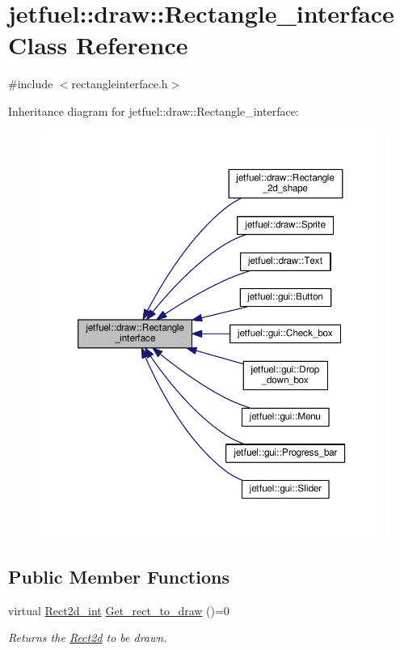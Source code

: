 \hypertarget{classjetfuel_1_1draw_1_1Rectangle__interface}{}\section{jetfuel\+:\+:draw\+:\+:Rectangle\+\_\+interface Class Reference}
\label{classjetfuel_1_1draw_1_1Rectangle__interface}


{\ttfamily \#include $<$rectangleinterface.\+h$>$}



Inheritance diagram for jetfuel\+:\+:draw\+:\+:Rectangle\+\_\+interface\+:
\nopagebreak
\begin{figure}[H]
\begin{center}
\leavevmode
\includegraphics[width=350pt]{classjetfuel_1_1draw_1_1Rectangle__interface__inherit__graph}
\end{center}
\end{figure}
\subsection*{Public Member Functions}
\begin{DoxyCompactItemize}
\item 
virtual \hyperlink{classjetfuel_1_1draw_1_1Rect2d}{Rect2d\+\_\+int} \hyperlink{classjetfuel_1_1draw_1_1Rectangle__interface_a03fd3b6842ab7b3065379caec407296f}{Get\+\_\+rect\+\_\+to\+\_\+draw} ()=0
\begin{DoxyCompactList}\small\item\em Returns the \hyperlink{classjetfuel_1_1draw_1_1Rect2d}{Rect2d} to be drawn. \end{DoxyCompactList}\end{DoxyCompactItemize}


